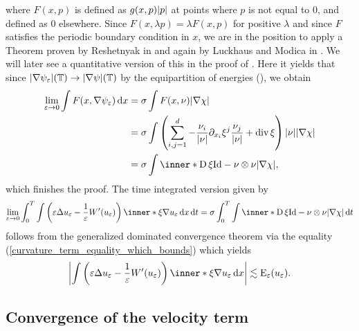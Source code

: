 where $ F ( x, p ) $ is defined as $ g ( x , p ) \abs{ p } $ at points where $ 
p $ is
not equal to 0, and defined as 0 elsewhere. Since $ F (x , \lambda p ) = 
\lambda F ( x, p ) $ for positive $ \lambda $ and since $ F $ satisfies the 
periodic boundary condition in $ x $, we are in the position to apply a 
Theorem proven by Reshetnyak in \cite{Reshetnyak_weak_convergence} and again by 
Luckhaus and Modica in \cite{luckhaus_modica_gibbs_thompson_relation}. We 
will later see a quantitative version of this in the proof of
. 
Here it yields that since $ \abs{ \nabla \psi_{ 
\varepsilon  } } ( \operatorname{\mathbb{T}} ) \to \abs{ \nabla \psi } ( \operatorname{\mathbb{T}} ) $ by the 
equipartition of energies (), we obtain
\begin{align*}
	\lim_{ \varepsilon \to 0 }
	\int
	F ( x, \nabla \psi_{ \varepsilon } )
	\dd{ x }
	& =
	\sigma
	\int
	F ( x , \nu )
	\abs{ \nabla \chi }
	\\
	& = 
	\sigma
	\int
	\left(
	\sum_{ i, j = 1}^{ d }
	-
	\frac{ \nu_{ i } }{ \abs{ \nu } }
	\partial_{ x_{ i } } \xi^{ j }
	\frac{ \nu_{ j } }{ \abs{ \nu } }
	+
	\divg \xi 
	\right)
	\abs{ \nu }
	\abs{ \nabla \chi }
	\\
	& =
	\sigma
	\int
	\inner*{ \diff \xi }{ \mathrm{Id} - \nu \otimes \nu }
	\abs{ \nabla \chi },
\end{align*}
which finishes the proof.
The time integrated version given by
\begin{equation*}
	\lim_{ \varepsilon \to 0 }
	\int_{ 0 }^{ T }
	\int
	\left(
	\varepsilon \Delta u_{ \varepsilon }
	- 
	\frac{ 1 }{ \varepsilon }
	W'( u_{ \varepsilon } )
	\right)
	\inner*{ \xi }{ \nabla u_{ \varepsilon } }
	\dd{ x }
	\dd{ t }
	=
	\sigma
	\int_{ 0 }^{ T }
	\int
	\inner*{ \diff \xi }{ \mathrm{Id} - \nu \otimes \nu }
	\abs{ \nabla \chi }
	\dd{ t }
\end{equation*} 
follows from the generalized dominated convergence theorem via the equality 
(\ref{curvature_term_equality_which_bounds}) which yields
\begin{equation*}
	\abs{
		\int
		\left(
		\varepsilon \Delta u_{ \varepsilon } 
		-
		\frac{ 1 }{ \varepsilon }
		W'( u_{ \varepsilon } )
		\right)
		\inner*{ \xi } { \nabla u_{ \varepsilon } }
		\dd{ x }
	}
	\lesssim
	\energy_{ \varepsilon } ( u_{ \varepsilon } ).
\end{equation*}


\subsection{Convergence of the velocity term}

